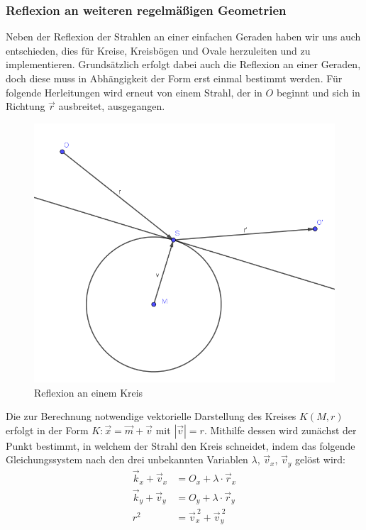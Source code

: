 \documentclass[reducespace,stylepage,semiarbeit]{spezidoc}
\begin{document}
\subsubsection{Reflexion an weiteren regelmäßigen Geometrien} \label{sec:weitereGeometrien}
Neben der Reflexion der Strahlen an einer einfachen Geraden haben wir uns auch entschieden, dies für Kreise, Kreisbögen und Ovale herzuleiten und zu implementieren. 
Grundsätzlich erfolgt dabei auch die Reflexion an einer Geraden, doch diese muss in Abhängigkeit der Form erst einmal bestimmt werden. 
Für folgende Herleitungen wird erneut von einem Strahl, der in $O$ beginnt und sich in Richtung $\vec{r}$ ausbreitet, ausgegangen.
\newpage
\begin{figure}
\includegraphics[scale=0.5]{pictures/CircleRef.png}
\caption{Reflexion an einem Kreis}
\end{figure}
Die zur Berechnung notwendige vektorielle Darstellung des Kreises $K(M, r)$ erfolgt in der Form $K: \vec{x} = \vec{m} + \vec{v}$ mit $|\vec{v}| = r$.
Mithilfe dessen wird zunächst der Punkt bestimmt, in welchem der Strahl den Kreis schneidet, indem das folgende Gleichungssystem nach den drei unbekannten Variablen $\lambda$, $\vec{v}_x$, $\vec{v}_y$ gelöst wird:
\begin{equation*}
\begin{split}
\vec{k}_x + \vec{v}_x & = O_x + \lambda\cdot\vec{r}_x\\
\vec{k}_y + \vec{v}_y & = O_y + \lambda\cdot\vec{r}_y\\
r^2 & = \vec{v}_x^{~2} + \vec{v}_y^{~2} 
\end{split}
\end{equation*}
\end{document}
